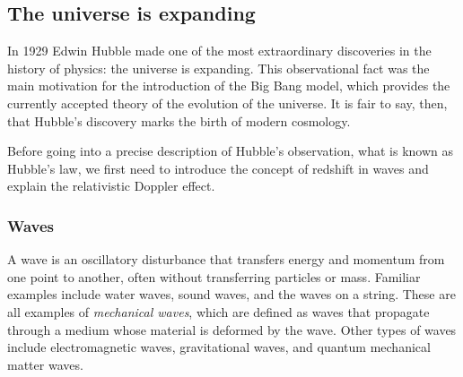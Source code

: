 \documentclass[11pt, a4paper,oneside,openright]{book}
\numberwithin{equation}{section}
\begin{document}
\subsection{The universe is expanding}

In 1929 Edwin Hubble made one of the most extraordinary discoveries in the history of physics: the universe is expanding. This observational fact was the main motivation for the introduction of the Big Bang model, which provides the currently accepted theory of the evolution of the universe. It is fair to say, then, that Hubble's discovery marks the birth of modern cosmology.

Before going into a precise description of Hubble's observation, what is known as Hubble's law, we first need to introduce the concept of redshift in waves and explain the relativistic Doppler effect.

\subsubsection{Waves}

A wave is an oscillatory disturbance that transfers energy and momentum from one point to another, often without transferring particles or mass. Familiar examples include water waves, sound waves, and the waves on a string. These are all examples of {\it mechanical waves}, which are defined as waves that propagate through a medium whose material is deformed by the wave. Other types of waves include electromagnetic waves, gravitational waves, and quantum mechanical matter waves.
\end{document}
